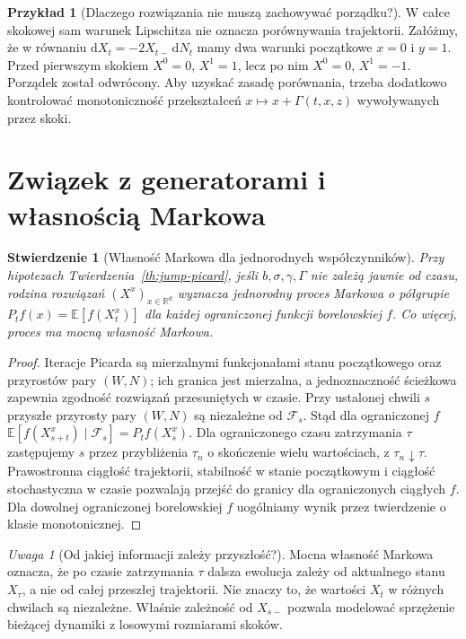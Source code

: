 \documentclass[11pt,a4paper,oneside]{report}
\numberwithin{equation}{chapter}
\theoremstyle{plain}
\newtheorem{stwierdzenie}[twierdzenie]{Stwierdzenie}
\theoremstyle{definition}
\newtheorem{przyklad}{Przykład}[chapter]
\theoremstyle{remark}
\newtheorem{uwaga}{Uwaga}[chapter]
\newcommand{\R}{\mathbb{R}}
\newcommand{\E}{\mathbb{E}}
\newcommand{\calF}{\mathcal{F}}
\newcommand{\dd}{\mathrm{d}}
\begin{document}
\begin{przyklad}[Dlaczego rozwiązania nie muszą zachowywać porządku?]
W całce skokowej sam warunek Lipschitza nie oznacza
porównywania trajektorii. Załóżmy, że w równaniu
$\dd X_t=-2X_{t-}\,\dd N_t$ mamy dwa warunki
początkowe $x=0$ i $y=1$. Przed pierwszym skokiem
$X^0=0$, $X^1=1$, lecz po nim $X^0=0$, $X^1=-1$.
Porządek został odwrócony. Aby uzyskać zasadę porównania,
trzeba dodatkowo kontrolować monotoniczność przekształceń
$x\mapsto x+\Gamma(t,x,z)$ wywoływanych przez skoki.
\end{przyklad}

\section{Związek z generatorami i własnością Markowa}

\begin{stwierdzenie}[Własność Markowa dla jednorodnych współczynników]
\label{prop:jump-markov}
Przy hipotezach Twierdzenia~\ref{th:jump-picard}, jeśli
$b,\sigma,\gamma,\Gamma$ nie zależą jawnie od czasu,
rodzina rozwiązań $(X^x)_{x\in\R^d}$ wyznacza
jednorodny proces Markowa o półgrupie
$P_tf(x)=\E[f(X_t^x)]$ dla każdej ograniczonej funkcji
borelowskiej $f$. Co więcej, proces ma mocną własność Markowa.
\end{stwierdzenie}
\begin{proof}
Iteracje Picarda są mierzalnymi funkcjonałami stanu
początkowego oraz przyrostów pary $(W,N)$; ich granica
jest mierzalna, a jednoznaczność ścieżkowa zapewnia
zgodność rozwiązań przesuniętych w czasie. Przy ustalonej
chwili $s$ przyszłe przyrosty pary $(W,N)$ są niezależne
od $\calF_s$. Stąd dla ograniczonej $f$
$\E[f(X_{s+t}^x)\mid\calF_s]=P_tf(X_s^x)$.
Dla ograniczonego czasu zatrzymania $\tau$ zastępujemy
$s$ przez przybliżenia $\tau_n$ o skończenie wielu
wartościach, z $\tau_n\downarrow\tau$. Prawostronna
ciągłość trajektorii, stabilność w stanie początkowym
i ciągłość stochastyczna w czasie pozwalają przejść
do granicy dla ograniczonych ciągłych $f$.
Dla dowolnej ograniczonej borelowskiej $f$ uogólniamy
wynik przez twierdzenie o klasie monotonicznej.
\end{proof}

\begin{uwaga}[Od jakiej informacji zależy przyszłość?]
Mocna własność Markowa oznacza, że po czasie zatrzymania
$\tau$ dalsza ewolucja zależy od aktualnego stanu
$X_\tau$, a nie od całej przeszłej trajektorii. Nie znaczy
to, że wartości $X_t$ w różnych chwilach są niezależne.
Właśnie zależność od $X_{s-}$ pozwala modelować
sprzężenie bieżącej dynamiki z losowymi rozmiarami skoków.
\end{uwaga}
\end{document}
